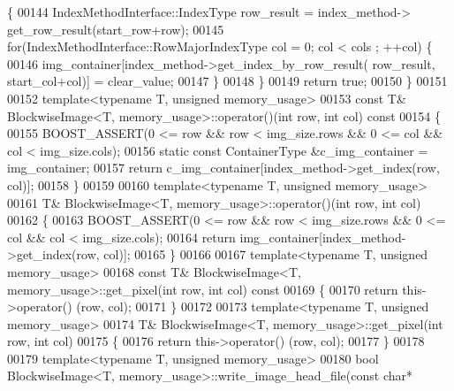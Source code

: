 \begin{DoxyCode}
       \{
00144                 IndexMethodInterface::IndexType row\_result = index\_method->
      get\_row\_result(start\_row+row);
00145                 \textcolor{keywordflow}{for}(IndexMethodInterface::RowMajorIndexType col = 0; col < cols
      ; ++col) \{
00146                         img\_container[index\_method->get\_index\_by\_row\_result(
      row\_result, start\_col+col)] = clear\_value;
00147                 \}
00148         \}
00149         \textcolor{keywordflow}{return} \textcolor{keyword}{true};
00150 \}
00151 
00152 \textcolor{keyword}{template}<\textcolor{keyword}{typename} T, \textcolor{keywordtype}{unsigned} memory\_usage>
00153 \textcolor{keyword}{const} T& BlockwiseImage<T, memory_usage>::operator()(\textcolor{keywordtype}{int} row, \textcolor{keywordtype}{int} col)\textcolor{keyword}{ const}
00154 \textcolor{keyword}{}\{
00155         BOOST\_ASSERT(0 <= row && row < img\_size.rows && 0 <= col && col < 
      img\_size.cols);
00156         \textcolor{keyword}{static} \textcolor{keyword}{const} ContainerType &c\_img\_container = img\_container;
00157         \textcolor{keywordflow}{return} c\_img\_container[index\_method->get\_index(row, col)];
00158 \}
00159 
00160 \textcolor{keyword}{template}<\textcolor{keyword}{typename} T, \textcolor{keywordtype}{unsigned} memory\_usage>
00161 T& BlockwiseImage<T, memory_usage>::operator()(\textcolor{keywordtype}{int} row, \textcolor{keywordtype}{int} col)
00162 \{
00163         BOOST\_ASSERT(0 <= row && row < img\_size.rows && 0 <= col && col < 
      img\_size.cols);
00164         \textcolor{keywordflow}{return} img\_container[index\_method->get\_index(row, col)];
00165 \}
00166 
00167 \textcolor{keyword}{template}<\textcolor{keyword}{typename} T, \textcolor{keywordtype}{unsigned} memory\_usage>
00168 \textcolor{keyword}{const} T& BlockwiseImage<T, memory_usage>::get_pixel(\textcolor{keywordtype}{int} row, \textcolor{keywordtype}{int} col)\textcolor{keyword}{ const}
00169 \textcolor{keyword}{}\{
00170         \textcolor{keywordflow}{return} this->operator() (row, col);
00171 \}
00172 
00173 \textcolor{keyword}{template}<\textcolor{keyword}{typename} T, \textcolor{keywordtype}{unsigned} memory\_usage>
00174 T& BlockwiseImage<T, memory_usage>::get_pixel(\textcolor{keywordtype}{int} row, \textcolor{keywordtype}{int} col)
00175 \{
00176         \textcolor{keywordflow}{return} this->operator() (row, col);
00177 \}
00178 
00179 \textcolor{keyword}{template}<\textcolor{keyword}{typename} T, \textcolor{keywordtype}{unsigned} memory\_usage>
00180 \textcolor{keywordtype}{bool} BlockwiseImage<T, memory_usage>::write_image_head_file(\textcolor{keyword}{const} \textcolor{keywordtype}{char}* 

\end{DoxyCode}
